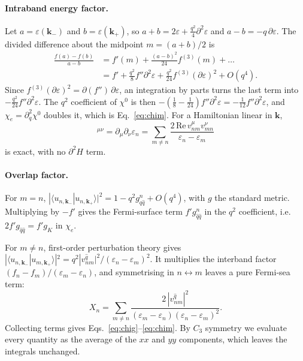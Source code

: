 \documentclass[aps,prb,twocolumn,superscriptaddress,floatfix,nofootinbib]{revtex4-2}
\newcommand{\bk}{\mathbf{k}}
\newcommand{\chie}{\chi_{e}}
\begin{document}
\paragraph{Intraband energy factor.}
Let $a=\varepsilon(\bk_-)$ and $b=\varepsilon(\bk_+)$, so $a+b=2\varepsilon+\tfrac{q^2}{4}\partial^2\varepsilon$ and $a-b=-q\,\partial\varepsilon$. The divided difference about the midpoint $m=(a+b)/2$ is
\begin{align}
\frac{f(a)-f(b)}{a-b}&=f'(m)+\frac{(a-b)^2}{24}f^{(3)}(m)+\dots\nonumber\\
&=f'+\frac{q^2}{8}f''\partial^2\varepsilon+\frac{q^2}{24}f^{(3)}(\partial\varepsilon)^2+O(q^4).
\end{align}
Since $f^{(3)}(\partial\varepsilon)^2=\partial(f'')\,\partial\varepsilon$, an integration by parts turns the last term into $-\tfrac{q^2}{24}f''\partial^2\varepsilon$. The $q^2$ coefficient of $\chi^0$ is then $-(\tfrac18-\tfrac1{24})f''\partial^2\varepsilon=-\tfrac1{12}f''\partial^2\varepsilon$, and $\chie=\partial_q^2\chi^0$ doubles it, which is Eq.~\eqref{eq:chim}. For a Hamiltonian linear in $\bk$,
\begin{equation}
[m_n^{-1}]^{\mu\nu}=\partial_\mu\partial_\nu\varepsilon_n=\sum_{m\neq n}\frac{2\,\mathrm{Re}\,v^\mu_{nm}v^\nu_{mn}}{\varepsilon_n-\varepsilon_m}
\end{equation}
is exact, with no $\partial^2H$ term.

\paragraph{Overlap factor.}
For $m=n$, $|\langle u_{n,\bk_-}|u_{n,\bk_+}\rangle|^2=1-q^2g^n_{\hat q\hat q}+O(q^4)$, with $g$ the standard metric. Multiplying by $-f'$ gives the Fermi-surface term $f'g^n_{\hat q\hat q}$ in the $q^2$ coefficient, i.e.\ $2f'g_{\hat q\hat q}=f'g_K$ in $\chie$.

For $m\ne n$, first-order perturbation theory gives $|\langle u_{n,\bk_-}|u_{m,\bk_+}\rangle|^2=q^2|v^{\hat q}_{nm}|^2/(\varepsilon_n-\varepsilon_m)^2$. It multiplies the interband factor $(f_n-f_m)/(\varepsilon_m-\varepsilon_n)$, and symmetrising in $n\leftrightarrow m$ leaves a pure Fermi-sea term:
\begin{equation}
X_n=\sum_{m\neq n}\frac{2\,|v^{\hat q}_{nm}|^2}{(\varepsilon_m-\varepsilon_n)(\varepsilon_n-\varepsilon_m)^2}.
\end{equation}
Collecting terms gives Eqs.~\eqref{eq:chig}--\eqref{eq:chim}. By $C_3$ symmetry we evaluate every quantity as the average of the $xx$ and $yy$ components, which leaves the integrals unchanged.
\end{document}
